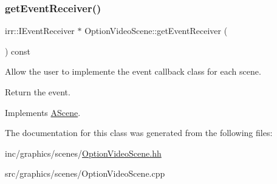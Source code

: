 \subsubsection{\texorpdfstring{get\+Event\+Receiver()}{getEventReceiver()}}
{\footnotesize\ttfamily irr\+::\+I\+Event\+Receiver $\ast$ Option\+Video\+Scene\+::get\+Event\+Receiver (\begin{DoxyParamCaption}{ }\end{DoxyParamCaption}) const\hspace{0.3cm}{\ttfamily [virtual]}}



Allow the user to implemente the event callback class for each scene. 

Return the event. 

Implements \hyperlink{classAScene_af521e5e6d30a5d2e5d30eb333e4d3abd}{A\+Scene}.



The documentation for this class was generated from the following files\+:\begin{DoxyCompactItemize}
\item 
inc/graphics/scenes/\hyperlink{OptionVideoScene_8hh}{Option\+Video\+Scene.\+hh}\item 
src/graphics/scenes/Option\+Video\+Scene.\+cpp\end{DoxyCompactItemize}
